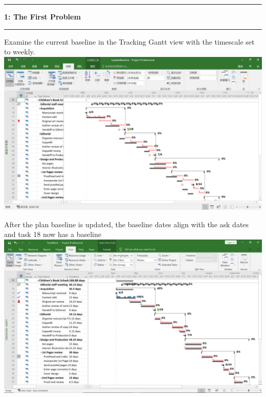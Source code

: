 \documentclass[11pt]{article}
\newcommand\question[2]{\vspace{.25in}\hrule\textbf{#1: #2}\vspace{.5em}\hrule\vspace{.10in}}
\begin{document}
\raggedright
\newcommand\NAME{Yao Xiao}  %
\newcommand\ANDREWID{2019180015}     %
\newcommand\HWNUM{4}              %


\question{1}{The First Problem}

Examine the current baseline in the Tracking Gantt view with the timescale set to weekly.\\
\includegraphics[scale=0.35]{p1-1.png}

After the plan baseline is updated, the baseline dates align with the ask dates and task 18 now has a baseline\\
\includegraphics[scale=0.35]{p1-2.png}
\end{document}
